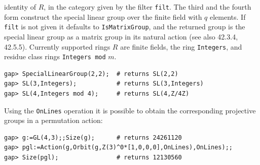 \begin{itemize}
identity of $R$, in the category given by the filter {\tt filt}. 
The third and the fourth form construct the special linear group over the finite field with $q$ elements.
If {\tt filt} is not given it defaults to {\tt IsMatrixGroup}, and the returned group is the special linear group as a
matrix group in its natural action (see also 42.3.4, 42.5.5).
Currently supported rings $R$ are finite fields, the ring {\tt Integers}, and residue
class rings {\tt Integers mod} $m$.
{\codesize
\begin{verbatim}
gap> SpecialLinearGroup(2,2);  # returns SL(2,2)
gap> SL(3,Integers);           # returns SL(3,Integers)
gap> SL(4,Integers mod 4);     # returns SL(4,Z/4Z)
\end{verbatim}}
\noindent Using the {\tt OnLines} operation it is possible to obtain the corresponding projective groups in a permutation
action:
{\codesize
\begin{verbatim}
gap> g:=GL(4,3);;Size(g);      # returns 24261120
gap> pgl:=Action(g,Orbit(g,Z(3)^0*[1,0,0,0],OnLines),OnLines);;
gap> Size(pgl);                # returns 12130560

\end{verbatim}}
\end{itemize}
